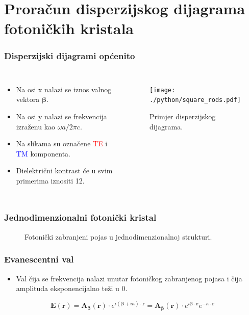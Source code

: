 \documentclass{beamer}
\begin{document}
\section{Proračun disperzijskog dijagrama fotoničkih kristala}
\begin{frame}
	\frametitle{Disperzijski dijagrami općenito}
	\begin{columns}
		\begin{itemize}
			\item Na osi x nalazi se iznos valnog vektora ${\bm{\beta}}$.
			\item Na osi y nalazi se frekvencija izraženu kao
				${\omega a/ 2 \pi c}$.
			\item Na slikama su označene \textcolor{red}{TE} i
				\textcolor{blue}{TM} komponenta.
			\item Dielektrični kontrast će u svim primerima iznositi 12.
		\end{itemize}
		\begin{figure}[ht]
			\centering
			\texttt{[image: ./python/square\_rods.pdf]}
			\caption{Primjer disperzijskog dijagrama.}
			\label{fig:square_band_diagram}
		\end{figure}
	\end{columns}
\end{frame}

\begin{frame}
	\frametitle{Jednodimenzionalni fotonički kristal}
	\begin{figure}[ht]
	\centering
    	\qquad
		\caption{Fotonički zabranjeni pojas u jednodimenzionalnoj strukturi.}
		\label{fig:1d_band_diagram}
	\end{figure}
\end{frame}

\begin{frame}
	\frametitle{Evanescentni val}
	\begin{itemize}
		\item Val čija se frekvencija nalazi unutar fotoničkog zabranjenog pojasa
			i čija amplituda eksponencijalno teži u 0.
	\end{itemize}
	\begin{equation} \label{eq:evan}
		\mathbf{E}(\mathbf{r}) =
		\mathbf{A}_{\bm{\beta}}(\mathbf{r}) \cdot
			e^{i ({\bm{\beta}} + i \kappa) \cdot \mathbf{r}} =
		\mathbf{A}_{\bm{\beta}}(\mathbf{r}) \cdot
			e^{i {\bm{\beta}} \cdot \mathbf{r}} e^{-\kappa \cdot \mathbf{r}}
	\end{equation}
\end{frame}
\end{document}
